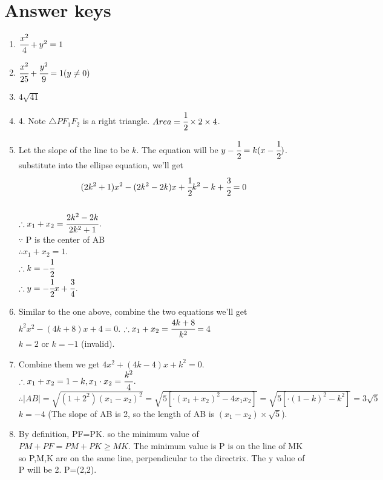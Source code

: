 \documentclass[letterpaper,12pt]{article}
\begin{document}
\pagebreak
\section{Answer keys}
\begin{enumerate}
    \item $\cfrac{x^2}{4}+y^2=1$
    \item $\cfrac{x^2}{25}+\cfrac{y^2}{9}=1(y\neq 0)$
    \item $4\sqrt{41}$
    \item 4. Note $\triangle{PF_1F_2}$ is a right triangle. $Area = \cfrac{1}{2}\times2\times4$.
    \item Let the slope of the line to be $k$. The equation will be $y-\cfrac{1}{2}=k(x-\cfrac{1}{2})$.\\
        substitute into the ellipse equation, we'll get\\
        \[(2k^2+1)x^2-(2k^2-2k)x+\cfrac{1}{2}k^2-k+\cfrac{3}{2}=0\]\\
        $\therefore x_1+x_2=\cfrac{2k^2-2k}{2k^2+1}$.\\
        $\because$ P is the center of AB \\
        $\therefore x_1+x_2=1$.\\
        $\therefore k=-\cfrac{1}{2}$\\
        $\therefore y=-\cfrac{1}{2}x+\cfrac{3}{4}$.
    \item Similar to the one above, combine the two equations we'll get
    $k^2x^2-(4k+8)x+4=0$. $\therefore x_1+x_2=\cfrac{4k+8}{k^2}=4$ \\ $k=2$ or $k=-1$ (invalid).
    \item Combine them we get $4x^2+(4k-4)x+k^2=0$.\\
    $\therefore x_1+x_2=1-k, x_1\cdot x_2=\cfrac{k^2}{4}$.\\
    $\therefore |AB|=\sqrt{(1+2^2)(x_1-x_2)^2}=\sqrt{5[\cdot{(x_1+x_2)^2-4x_1x_2}]}=\sqrt{5[\cdot{(1-k)^2-k^2}]}=3\sqrt{5}$\\
    $k=-4 $ (The slope of AB is 2, so the length of AB is $(x_1-x_2)\times\sqrt5$).
    \item By definition, PF=PK. so the minimum value of $PM+PF=PM+PK \geq MK$. The minimum value is P is on the line of MK
    so P,M,K are on the same line, perpendicular to the directrix. The y value of P will be 2. P=(2,2).


\end{enumerate}
\end{document}
